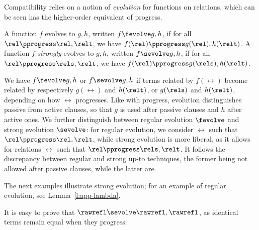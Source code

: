 \documentclass{lmcs}
\theoremstyle{defC}
\begin{document}
Compatibility relies on a notion of \emph{evolution} for functions on relations,
which can be seen has the higher-order equivalent of progress.
\begin{defi}%
  A function $f$ evolves to $g, h$, written $f \fevolve g, h$, if for all $\rel
  \pprogress \rel, \relt$, we have $f(\rel) \pprogress g(\rel), h(\relt)$. A
  function $f$ \emph{strongly} evolves to $g, h$, written $f \sevolve g, h$, if
  for all $\rel \pprogress \rels, \relt$, we have $f(\rel) \pprogress g(\rels),
  h(\relt)$.
\end{defi}
\noindent
We have $f \fevolve g, h$ or $f \sevolve g, h$ if terms related by $f(\rel)$
become related by respectively $g(\rel)$ and $h(\relt)$, or $g(\rels)$ and
$h(\relt)$, depending on how $\rel$ progresses. Like with progress, evolution
distinguishes passive from active clauses, so that $g$ is used after passive
clauses and $h$ after active ones. We further distinguish between regular
evolution $\fevolve$ and strong evolution $\sevolve$: for regular evolution, we
consider $\rel$ such that $\rel \pprogress \rel, \relt$, while strong evolution
is more liberal, as it allows for relations $\rel$ such that $\rel \pprogress
\rels, \relt$. It follows the discrepancy between regular and strong up-to
techniques, the former being not allowed after passive clauses, while the latter
are.

The next examples illustrate strong evolution; for an example of regular
evolution, see Lemma~\ref{l:app-lambda}.

\begin{exa}
  It is easy to prove that $\rawrefl \sevolve \rawrefl, \rawrefl$, as identical
  terms remain equal when they progress.
\end{exa}
\end{document}
